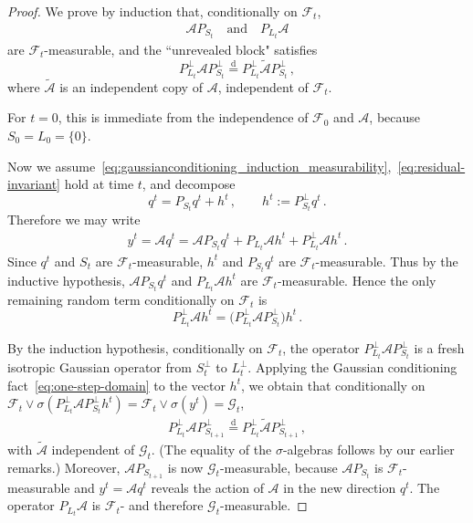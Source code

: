 \documentclass[10pt,a4paper]{amsart}
\newcommand{\cA}{\mathcal A}
\begin{document}
\begin{proof}
We prove by induction that, conditionally on $\mathscr F_t$,
\begin{align}\label{eq:gaussianconditioning_induction_measurability}
  \mathcal A P_{S_t}
  \quad\text{and}\quad
  P_{L_t}\mathcal A
\end{align}
are $\mathscr F_t$-measurable, and the ``unrevealed block" satisfies
\begin{equation}\label{eq:residual-invariant}
  P_{L_t}^\perp \mathcal A P_{S_t}^\perp
  \stackrel{\mathrm d}{=}
  P_{L_t}^\perp \widetilde{\mathcal A} P_{S_t}^\perp\,,
\end{equation}
where $\widetilde{\mathcal A}$ is an independent copy of $\mathcal A$, independent of $\mathscr F_t$.

For $t=0$, this is immediate from the independence of $\mathscr F_0$ and $\mathcal A$, because $S_0=L_0=\{0\}$.

Now we assume~\eqref{eq:gaussianconditioning_induction_measurability},~\eqref{eq:residual-invariant} hold at time $t$, and decompose
\[
  q^t=P_{S_t}q^t+h^t\,, \qquad h^t:=P_{S_t}^\perp q^t\,.
\]
Therefore we may write
\begin{align*}
y^t=\mathcal A q^t = \mathcal A P_{S_t}q^t + P_{L_t}\mathcal A h^t + P_{L_t}^\perp \mathcal A h^t\,.
\end{align*}
Since $q^t$ and $S_t$ are $\mathscr F_t$-measurable, $h^t$ and $P_{S_t}q^t$ are $\mathscr F_t$-measurable. Thus by the inductive hypothesis, $\mathcal A P_{S_t}q^t$ and $P_{L_t}\mathcal A h^t$ are $\mathscr F_t$-measurable. Hence the only remaining random term conditionally on $\mathscr F_t$ is
\[
  P_{L_t}^\perp \mathcal A h^t
  =
  \big(P_{L_t}^\perp \mathcal A P_{S_t}^\perp\big)h^t\,.
\]

By the induction hypothesis, conditionally on $\mathscr F_t$, the operator $P_{L_t}^\perp \mathcal A P_{S_t}^\perp$ is a fresh isotropic Gaussian operator from $S_t^\perp$ to $L_t^\perp$. Applying the Gaussian conditioning fact~\eqref{eq:one-step-domain} to the vector $h^t$, we obtain that conditionally on $\mathscr F_t \vee \sigma( P_{L_t}^\perp \cA P_{S_t}^\perp h^t)= \mathscr F_t\vee\sigma(y^t) = \mathscr G_t$,
\begin{align}\label{eq:gaussianconditioning_induction_intermediatefreshgaussian}
  P_{L_t}^\perp \mathcal A P_{S_{t+1}}^\perp
  \stackrel{\mathrm d}{=}
  P_{L_t}^\perp \widetilde{\mathcal A}P_{S_{t+1}}^\perp\,,
\end{align}
with $\widetilde{\mathcal A}$ independent of $\mathscr G_t$. (The equality of the $\sigma$-algebras follows by our earlier remarks.) Moreover, $\mathcal A P_{S_{t+1}}$ is now $\mathscr G_t$-measurable, because $\mathcal A P_{S_t}$ is  $\mathscr F_t$-measurable and $y^t=\mathcal A q^t$ reveals the action of $\mathcal A$ in the new direction $q^t$. The operator $P_{L_t}\mathcal A$ is $\mathscr F_t$- and therefore $\mathscr G_t$-measurable.


\end{proof}
\end{document}
